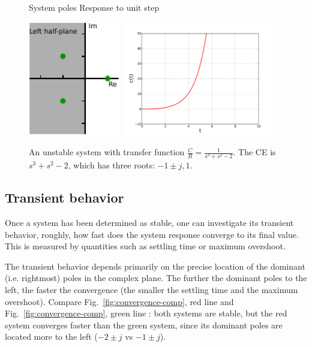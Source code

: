 \documentclass[a4paper,11pt]{report}
\theoremstyle{definition}
\begin{document}
\begin{figure}[H]
  \centering
  \noindent System poles \hspace{2cm} Response to unit step

  \vspace{0.2cm}
  \includegraphics[height=5cm]{fig/stability-no.pdf}
  \includegraphics[height=5cm]{fig/sys-unstable.pdf}
  \caption{An unstable system with transfer function
    $\frac{C}{R}=\frac{1}{s^3+s^2-2}$. The CE is $s^3+s^2-2$,
    which has three roots: $-1\pm j, 1$.}
  \label{fig:ex-unstable}
\end{figure}


\subsection{Transient behavior}

Once a system has been determined as stable, one can investigate its
transient behavior, roughly, how fast does the system response
converge to its final value. This is measured by quantities such as
settling time or maximum overshoot.

The transient behavior depends primarily on the precise location of
the dominant (i.e. rightmost) poles in the complex plane. The further
the dominant poles to the left, the faster the convergence (the
smaller the settling time and the maximum overshoot). Compare
Fig.~\ref{fig:convergence-comp}, red line and
Fig.~\ref{fig:convergence-comp}, green line : both systems are stable,
but the red system converges faster than the green system, since its
dominant poles are located more to the left ($-2\pm j$ vs $-1\pm
j$).
\end{document}
